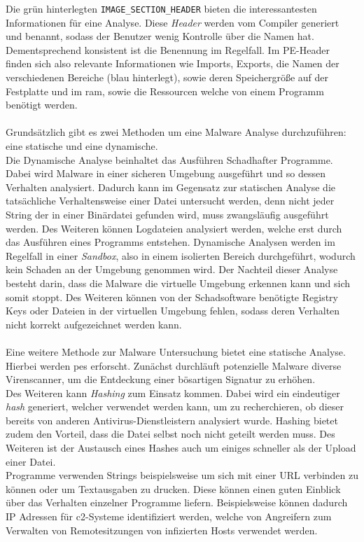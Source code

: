 \documentclass[
    12pt, %
    DIV10,
    ngerman, %
    a4paper, %
    oneside, %
    titlepage, %
    parskip=half, %
    headings=normal, %
    listof=totoc, %
    bibliography=totoc, %
    index=totoc, %
    captions=tableheading, %
    final %
]{scrreprt}
\begin{document}
Die grün hinterlegten \texttt{IMAGE\_SECTION\_HEADER} bieten die interessantesten Informationen für eine Analyse. Diese \emph{Header} werden vom Compiler generiert und benannt, sodass der Benutzer wenig Kontrolle über die Namen hat. Dementsprechend konsistent ist die Benennung im Regelfall. Im PE-Header finden sich also relevante Informationen wie Imports, Exports, die Namen der verschiedenen Bereiche (blau hinterlegt), sowie deren Speichergröße auf der Festplatte und im \ac{ram}, sowie die Ressourcen welche von einem Programm benötigt werden.
\\\\
Grundsätzlich gibt es zwei Methoden um eine Malware Analyse durchzuführen: eine statische und eine dynamische.\\
Die Dynamische Analyse beinhaltet das Ausführen Schadhafter Programme. Dabei wird Malware in einer sicheren Umgebung ausgeführt und so dessen Verhalten analysiert. Dadurch kann im Gegensatz zur statischen Analyse die tatsächliche Verhaltensweise einer Datei untersucht werden, denn nicht jeder String der in einer Binärdatei gefunden wird, muss zwangsläufig ausgeführt werden. Des Weiteren können Logdateien analysiert werden, welche erst durch das Ausführen eines Programms entstehen.
Dynamische Analysen werden im Regelfall in einer \emph{Sandbox}, also in einem isolierten Bereich durchgeführt, wodurch kein Schaden an der Umgebung genommen wird.
Der Nachteil dieser Analyse besteht darin, dass die Malware die virtuelle Umgebung erkennen kann und sich somit stoppt. Des Weiteren können von der Schadsoftware benötigte Registry Keys oder Dateien in der virtuellen Umgebung fehlen, sodass deren Verhalten nicht korrekt aufgezeichnet werden kann.\\\\
Eine weitere Methode zur Malware Untersuchung bietet eine statische Analyse. Hierbei werden \ac{pes} erforscht. Zunächst durchläuft potenzielle Malware diverse Virenscanner, um die Entdeckung einer bösartigen Signatur zu erhöhen.\\ 
Des Weiteren kann \emph{Hashing} zum Einsatz kommen. Dabei wird ein eindeutiger \emph{hash} generiert, welcher verwendet werden kann, um zu recherchieren, ob dieser bereits von anderen Antivirus-Dienstleistern analysiert wurde. Hashing bietet zudem den Vorteil, dass die Datei selbst noch nicht geteilt werden muss. Des Weiteren ist der Austausch eines Hashes auch um einiges schneller als der Upload einer Datei.\\
Programme verwenden Strings beispielsweise um sich mit einer URL verbinden zu können oder um Textausgaben zu drucken. Diese können einen guten Einblick über das Verhalten einzelner Programme liefern. Beispielsweise können dadurch IP Adressen für \ac{c2}-Systeme identifiziert werden, welche von Angreifern zum Verwalten von Remotesitzungen von infizierten Hosts verwendet werden.\\
\end{document}
